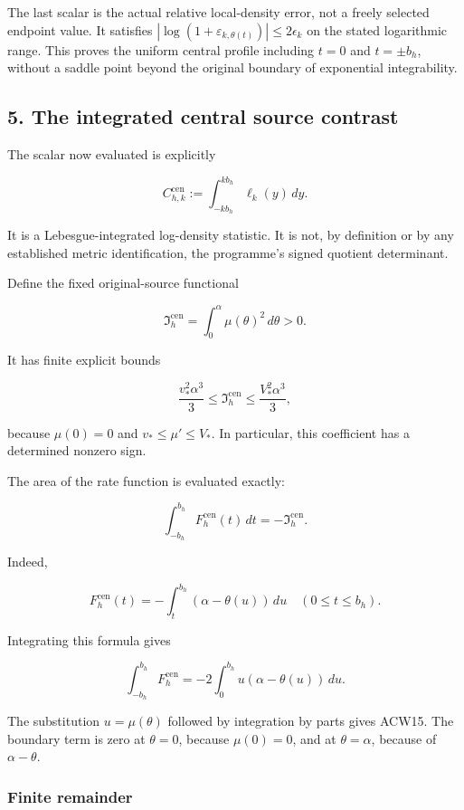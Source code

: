 \documentclass[11pt,a4paper]{article}
\begin{document}
The last scalar is the actual relative local-density error, not a freely selected endpoint value. It satisfies
\(|\log(1+\varepsilon_{k,\theta(t)})|\le2\epsilon_k\) on the stated logarithmic range. This proves the uniform central profile including \(t=0\) and \(t=\pm b_h\), without a saddle point beyond the original boundary of exponential integrability.

\subsection{5. The integrated central source contrast}\label{acw:the-integrated-central-source-contrast}

The scalar now evaluated is explicitly

\[
C_{h,k}^{\mathrm{cen}}:=
\int_{-kb_h}^{kb_h}\ell_k(y)\,dy.
\]

It is a Lebesgue-integrated log-density statistic. It is not, by definition or by any established metric identification, the programme's signed quotient determinant.

Define the fixed original-source functional

\[
\mathfrak I_h^{\mathrm{cen}}
=\int_0^\alpha\mu(\theta)^2\,d\theta>0.
\tag{ACW14}
\]

It has finite explicit bounds

\[
\frac{v_*^2\alpha^3}{3}\le\mathfrak I_h^{\mathrm{cen}}
\le\frac{V_*^2\alpha^3}{3},
\]

because \(\mu(0)=0\) and \(v_*\le\mu'\le V_*\). In particular, this coefficient has a determined nonzero sign.

The area of the rate function is evaluated exactly:

\[
\boxed{
\int_{-b_h}^{b_h}F_h^{\mathrm{cen}}(t)\,dt
=-\mathfrak I_h^{\mathrm{cen}}.}
\tag{ACW15}
\]

Indeed,

\[
F_h^{\mathrm{cen}}(t)
=-\int_t^{b_h}(\alpha-\theta(u))\,du
\quad(0\le t\le b_h).
\]

Integrating this formula gives

\[
\int_{-b_h}^{b_h}F_h^{\mathrm{cen}}
=-2\int_0^{b_h}u(\alpha-\theta(u))\,du.
\]

The substitution \(u=\mu(\theta)\) followed by integration by parts gives ACW15. The boundary term is zero at \(\theta=0\), because \(\mu(0)=0\), and at \(\theta=\alpha\), because of \(\alpha-\theta\).

\subsubsection{Finite remainder}\label{acw:finite-remainder}
\end{document}
